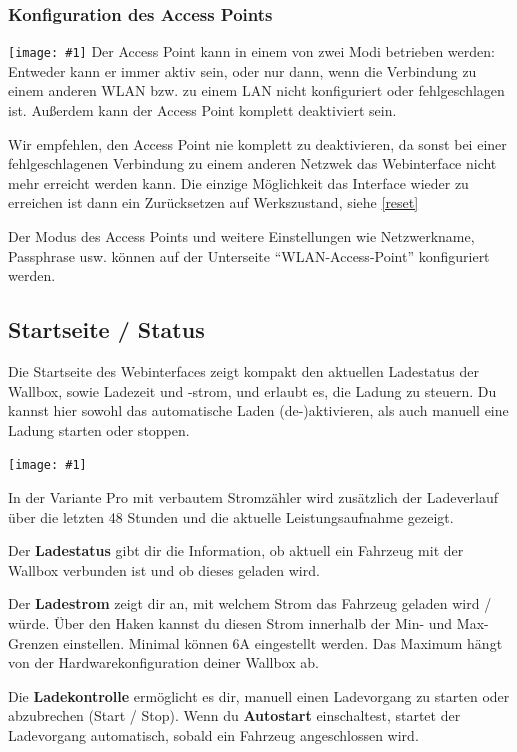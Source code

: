 \documentclass[a4paper,10pt]{article}
\newcommand{\hint}[1]{\begin{tcolorbox}[colback=boxgray,colframe=black,coltext=
white,title=Hinweis]#1\end{tcolorbox}}
\newcommand{\gfx}[1]{\texttt{[image: \#1]}}
\begin{document}
\begin{multicols*}{2}
	\subsubsection{Konfiguration des Access Points}
	\gfx{./img_warp2/resized/web_wifi_ap}
	Der Access Point kann in einem von zwei Modi betrieben werden: Entweder kann er immer aktiv sein,
	oder nur dann, wenn die Verbindung zu einem anderen WLAN bzw. zu einem LAN nicht konfiguriert oder fehlgeschlagen ist.
	Außerdem kann der Access Point komplett deaktiviert sein.
	\hint{Wir empfehlen, den Access Point nie komplett zu deaktivieren, da sonst bei einer
		fehlgeschlagenen Verbindung zu einem anderen Netzwek das Webinterface nicht mehr erreicht
		werden kann. Die einzige Möglichkeit das Interface wieder zu erreichen ist dann ein Zurücksetzen auf Werkszustand, siehe \ref{reset}}
	Der Modus des Access Points und weitere Einstellungen wie Netzwerkname, Passphrase usw. können
	auf der Unterseite \enquote{WLAN-Access-Point} konfiguriert werden.

	\subsection{Startseite / Status}
	Die Startseite des Webinterfaces zeigt kompakt den aktuellen Ladestatus der
	Wallbox, sowie Ladezeit und -strom, und erlaubt es, die Ladung zu steuern.
	Du kannst hier sowohl das automatische Laden (de-)aktivieren, als auch
	manuell eine Ladung starten oder stoppen.

	\gfx{./img_warp2/resized/web_status}

	In der Variante Pro mit verbautem Stromzähler wird zusätzlich der Ladeverlauf
	über die letzten 48 Stunden und die aktuelle Leistungsaufnahme gezeigt.

	Der \textbf{Ladestatus} gibt dir die Information, ob aktuell ein
	Fahrzeug mit der Wallbox verbunden ist und ob dieses geladen wird.

	Der \textbf{Ladestrom} zeigt dir an, mit welchem Strom das Fahrzeug geladen
	wird / würde. Über den Haken kannst du diesen Strom innerhalb der Min-
	und Max-Grenzen einstellen. Minimal können 6A eingestellt werden. Das
	Maximum hängt von der Hardwarekonfiguration deiner Wallbox ab.

	Die \textbf{Ladekontrolle} ermöglicht es dir, manuell einen Ladevorgang zu
	starten oder abzubrechen (Start / Stop). Wenn du \textbf{Autostart}
	einschaltest, startet der Ladevorgang automatisch, sobald ein Fahrzeug
	angeschlossen wird.


\end{multicols*}
\end{document}
